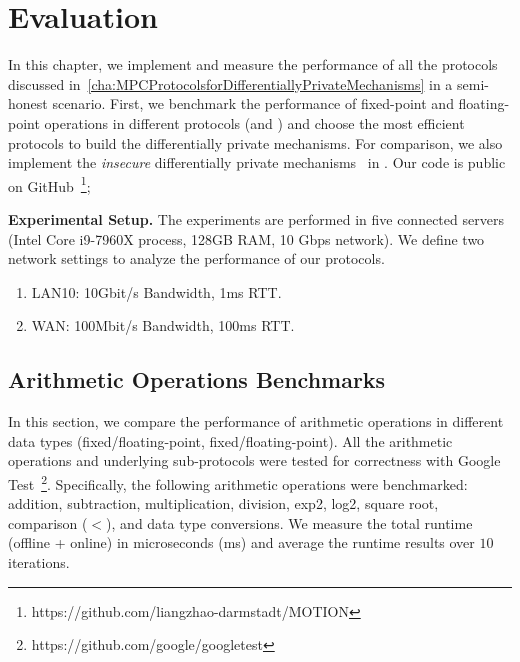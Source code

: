 \chapter{Evaluation}
\label{cha:evaluation}



In this chapter, we implement and measure the performance of all the protocols discussed in~\autoref{cha:MPCProtocolsforDifferentiallyPrivateMechanisms} in a semi-honest scenario.
First, we benchmark the performance of fixed-point and floating-point operations in different \smpc protocols (\booleanGMW and \arithmeticGMW) and choose the most efficient \smpc protocols to build the differentially private mechanisms. For comparison, we also implement the \textit{insecure} differentially private mechanisms~\cite{eigner2014differentially} in \smpc.
Our code is public on GitHub~\footnote{https://github.com/liangzhao-darmstadt/MOTION};



\textbf{Experimental Setup.}
The experiments are performed in five connected servers (Intel Core i9-7960X process, 128GB RAM, 10 Gbps network). We define two network settings to analyze the performance of our \smpc protocols.
\begin{enumerate}
    \item LAN10: 10Gbit/s Bandwidth, 1ms RTT.
    \item WAN: 100Mbit/s Bandwidth, 100ms RTT.
\end{enumerate}

\section{Arithmetic Operations Benchmarks}
\label{sec:ArithmeticOperationsPerformanceEvaluation}
In this section, we compare the performance of arithmetic operations in different data types (\booleanGMW fixed/floating-point, \arithmeticGMW fixed/floating-point).
All the arithmetic operations and underlying sub-protocols were tested for correctness with Google Test~\footnote{https://github.com/google/googletest}.
Specifically, the following arithmetic operations were benchmarked: addition, subtraction, multiplication, division, exp2, log2, square root, comparison ($<$), and data type conversions.
We measure the total runtime (offline + online) in microseconds (ms) and average the runtime results over $10$ iterations.

